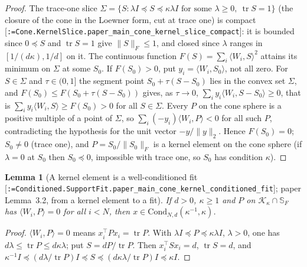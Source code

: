 \documentclass[11pt]{article}
\makeatletter
\newcommand{\formal@break}[1]{\@tfor\formal@tok:=#1\do{%
  \formal@tok
  \expandafter\ifx\formal@tok.\allowbreak\else
  \expandafter\ifx\formal@tok\_\allowbreak\fi\fi}}
\DeclareRobustCommand{\formal}[1]{\textnormal{[\texttt{\small\formal@break{#1}}]}}
\newcommand{\ip}[2]{\langle #1, #2\rangle}
\newcommand{\norm}[1]{\lVert #1\rVert}
\newcommand{\tr}{\operatorname{tr}}
\newcommand{\Fro}{F}
\newcommand{\Id}{I}
\newcommand{\cone}{\mathcal{K}}
\newcommand{\Cond}{\mathrm{Cond}}
\theoremstyle{plain}
\newtheorem{lemma}[theorem]{Lemma}
\theoremstyle{definition}
\makeatother
\begin{document}
\begin{proof}
The trace-one slice $\Sigma = \{S : \lambda\Id \preceq S \preceq \kappa\lambda\Id \text{ for some } \lambda \ge 0,\ \tr S = 1\}$
(the closure of the cone in the Loewner form, cut at trace one) is compact
\formal{Cone.KernelSlice.paper\_main\_cone\_kernel\_slice\_compact}: it is
bounded since $0 \preceq S$ and $\tr S = 1$ give $\norm{S}_\Fro \le 1$, and
closed since $\lambda$ ranges in $[1/(d\kappa), 1/d]$ on it. The continuous
function $F(S) = \sum_i\ip{W_i}{S}^2$ attains its minimum on $\Sigma$ at
some $S_0$. If $F(S_0) > 0$, put $y_i = \ip{W_i}{S_0}$, not all zero. For $S \in \Sigma$
and $\tau \in (0,1]$ the segment point $S_0 + \tau(S - S_0)$ lies in the
convex set $\Sigma$, and $F(S_0) \le F(S_0 + \tau(S - S_0))$ gives, as
$\tau \to 0$, $\sum_iy_i\ip{W_i}{S - S_0} \ge 0$, that is
$\sum_iy_i\ip{W_i}{S} \ge F(S_0) > 0$ for all $S \in \Sigma$. Every $P$ on the
cone sphere is a positive multiple of a point of $\Sigma$, so
$\sum_i(-y_i)\ip{W_i}{P} < 0$ for all such $P$, contradicting the hypothesis
for the unit vector $-y/\norm{y}_2$. Hence $F(S_0) = 0$; $S_0 \ne 0$
(trace one), and $P = S_0/\norm{S_0}_\Fro$ is a kernel element on the cone
sphere (if $\lambda = 0$ at $S_0$ then $S_0 \preceq 0$, impossible with trace
one, so $S_0$ has condition $\kappa$).
\end{proof}

\begin{lemma}[A kernel element is a well-conditioned fit \formal{Conditioned.SupportFit.paper\_main\_cone\_kernel\_conditioned\_fit}; paper Lemma~3.2, from a kernel element to a fit]\label{lem:kernel_fit}
If $d > 0$, $\kappa \ge 1$ and $P$ on $\cone_\kappa\cap\mathbb{S}_\Fro$ has
$\ip{W_i}{P} = 0$ for all $i < N$, then $x \in \Cond_{N,d}(\kappa^{-1}, \kappa)$.
\end{lemma}

\begin{proof}
$\ip{W_i}{P} = 0$ means $x_i^{\top}Px_i = \tr P$. With $\lambda\Id \preceq P \preceq \kappa\lambda\Id$,
$\lambda > 0$, one has $d\lambda \le \tr P \le d\kappa\lambda$; put
$S = dP/\tr P$. Then $x_i^{\top}Sx_i = d$, $\tr S = d$, and
$\kappa^{-1}\Id \preceq (d\lambda/\tr P)\Id \preceq S \preceq (d\kappa\lambda/\tr P)\Id \preceq \kappa\Id$.
\end{proof}
\end{document}
